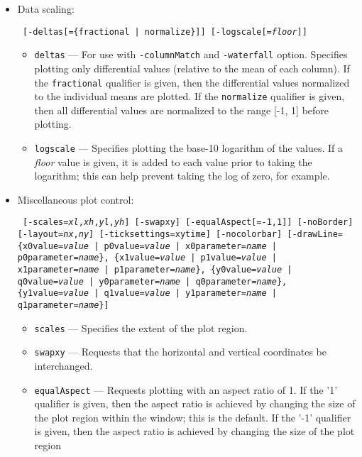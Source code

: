 \begin{itemize}
\begin{itemize}
    \item Data scaling:
\begin{flushleft}{\tt
[-deltas[=\{fractional | normalize\}]] [-logscale[={\em floor}]]
}\end{flushleft}
        \begin{itemize}
        \item \verb|deltas| --- For use with \verb|-columnMatch| and \verb|-waterfall| option.  Specifies plotting 
        only differential values (relative to the mean of each column).  If the \verb|fractional| 
        qualifier is given, then the differential values normalized to the individual
        means are plotted.  If the \verb|normalize| qualifier is given, then all differential values
        are normalized to the range [-1, 1] before plotting.
        \item \verb|logscale| --- Specifies plotting the base-10 logarithm of the values.  If a
        {\em floor} value is given, it is added to each value prior to taking the logarithm; this
        can help prevent taking the log of zero, for example.
        \end{itemize}
    \item Miscellaneous plot control:
\begin{flushleft}{\tt
[-scales={\em xl},{\em xh},{\em yl},{\em yh}] 
[-swapxy] [-equalAspect[={-1,1}]]
[-noBorder] [-layout={\em nx},{\em ny}]
[-ticksettings={xy}time] [-nocolorbar] 
[-drawLine=\{x0value={\em value} | p0value={\em value} | x0parameter={\em name} | p0parameter={\em name}\},
            \{x1value={\em value} | p1value={\em value} | x1parameter={\em name} | p1parameter={\em name}\},
            \{y0value={\em value} | q0value={\em value} | y0parameter={\em name} | q0parameter={\em name}\},
            \{y1value={\em value} | q1value={\em value} | y1parameter={\em name} | q1parameter={\em name}\}]
}\end{flushleft}
        \begin{itemize}
        \item \verb|scales| --- Specifies the extent of the plot region.
        \item \verb|swapxy| --- Requests that the horizontal and vertical coordinates be interchanged.
        \item \verb|equalAspect| --- Requests plotting with an aspect ratio of 1.  If the '1' qualifier
        is given, then the aspect ratio is achieved by changing the size of the plot region within the window;
        this is the default.
        If the '-1' qualifier is given, then the aspect ratio is achieved by changing the size of the plot region

\end{itemize}
\end{itemize}
\end{itemize}
